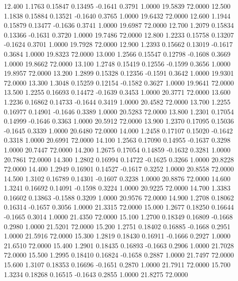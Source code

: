   12.400   1.1763   0.15847   0.13495  -0.1641   0.3791   1.0000  19.5839  72.0000
  12.500   1.1838   0.15884   0.13521  -0.1640   0.3765   1.0000  19.6432  72.0000
  12.600   1.1944   0.15879   0.13477  -0.1636   0.3741   1.0000  19.6987  72.0000
  12.700   1.2079   0.15834   0.13366  -0.1631   0.3720   1.0000  19.7486  72.0000
  12.800   1.2233   0.15758   0.13207  -0.1624   0.3701   1.0000  19.7928  72.0000
  12.900   1.2393   0.15662   0.13019  -0.1617   0.3684   1.0000  19.8323  72.0000
  13.000   1.2566   0.15547   0.12798  -0.1608   0.3669   1.0000  19.8662  72.0000
  13.100   1.2748   0.15419   0.12556  -0.1599   0.3656   1.0000  19.8957  72.0000
  13.200   1.2899   0.15328   0.12356  -0.1591   0.3642   1.0000  19.9301  72.0000
  13.300   1.3048   0.15259   0.12154  -0.1582   0.3627   1.0000  19.9641  72.0000
  13.500   1.2255   0.16693   0.14472  -0.1639   0.3453   1.0000  20.3771  72.0000
  13.600   1.2236   0.16862   0.14733  -0.1644   0.3419   1.0000  20.4582  72.0000
  13.700   1.2255   0.16977   0.14901  -0.1646   0.3389   1.0000  20.5283  72.0000
  13.800   1.2301   0.17054   0.14999  -0.1646   0.3363   1.0000  20.5912  72.0000
  13.900   1.2370   0.17095   0.15036  -0.1645   0.3339   1.0000  20.6480  72.0000
  14.000   1.2458   0.17107   0.15020  -0.1642   0.3318   1.0000  20.6991  72.0000
  14.100   1.2563   0.17090   0.14955  -0.1637   0.3298   1.0000  20.7447  72.0000
  14.200   1.2675   0.17054   0.14859  -0.1632   0.3281   1.0000  20.7861  72.0000
  14.300   1.2802   0.16994   0.14722  -0.1625   0.3266   1.0000  20.8228  72.0000
  14.400   1.2949   0.16901   0.14527  -0.1617   0.3252   1.0000  20.8558  72.0000
  14.500   1.3102   0.16789   0.14301  -0.1607   0.3238   1.0000  20.8876  72.0000
  14.600   1.3241   0.16692   0.14091  -0.1598   0.3224   1.0000  20.9225  72.0000
  14.700   1.3383   0.16602   0.13863  -0.1588   0.3209   1.0000  20.9576  72.0000
  14.900   1.2708   0.18062   0.16314  -0.1657   0.3056   1.0000  21.3315  72.0000
  15.000   1.2677   0.18250   0.16644  -0.1665   0.3014   1.0000  21.4350  72.0000
  15.100   1.2700   0.18349   0.16809  -0.1668   0.2980   1.0000  21.5201  72.0000
  15.200   1.2751   0.18402   0.16885  -0.1668   0.2951   1.0000  21.5916  72.0000
  15.300   1.2819   0.18430   0.16911  -0.1666   0.2927   1.0000  21.6510  72.0000
  15.400   1.2901   0.18435   0.16893  -0.1663   0.2906   1.0000  21.7028  72.0000
  15.500   1.2995   0.18410   0.16824  -0.1658   0.2887   1.0000  21.7497  72.0000
  15.600   1.3107   0.18353   0.16696  -0.1651   0.2870   1.0000  21.7911  72.0000
  15.700   1.3234   0.18268   0.16515  -0.1643   0.2855   1.0000  21.8275  72.0000
